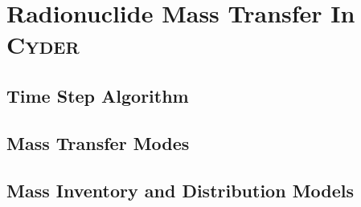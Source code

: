 
\section{Radionuclide Mass Transfer In \textsc{Cyder}}\label{sec:nuclide_models}


\subsection{Time Step Algorithm}\label{sec:timestep}


\subsection{Mass Transfer Modes}\label{sec:mass_transfer}


\subsection{Mass Inventory and Distribution Models}





